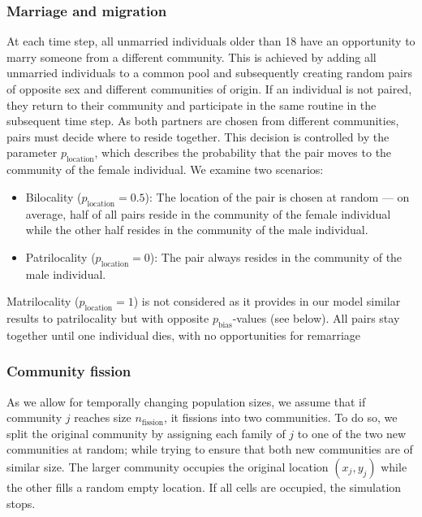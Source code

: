 \documentclass[9pt,twocolumn,twoside,lineno]{pnas-new}
\begin{document}
\subsubsection*{Marriage and migration} 
At each time step, all unmarried individuals older than 18 have an opportunity to marry someone from a different community. 
This is achieved by adding all unmarried individuals to a common pool and subsequently creating random pairs of opposite sex and different communities of origin. 
If an individual is not paired, they return to their community and participate in the same routine in the subsequent time step.
As both partners are chosen from different communities, pairs must decide where to reside together. 
This decision is controlled by the parameter $p_\text{location}$, which describes the probability that the pair moves to the community of the female individual. 
We examine two scenarios:
\begin{itemize}
\item Bilocality ($p_\text{location}=0.5$): The location of the pair is chosen at random --- on average, half of all pairs reside in the community of the female individual while the other half resides in the community of the male individual.
\item Patrilocality ($p_\text{location}=0$): The pair always resides in the community of the male individual.
\end{itemize}
Matrilocality ($p_\text{location}=1$) is not considered as it provides in our model similar results to patrilocality but with opposite $p_\text{bias}$-values (see below).
All pairs stay together until one individual dies, with no opportunities for remarriage 

\subsubsection*{Community fission} As we allow for temporally changing population sizes, we assume that if community $j$ reaches size $n_\text{fission}$, it fissions into two communities. 
To do so, we split the original community by assigning each family of $j$ to one of the two new communities at random; while trying to ensure that both new communities are of similar size.
The larger community occupies the original location $(x_j,y_j)$ while the other fills a random empty location. 
If all cells are occupied, the simulation stops. 
\end{document}
